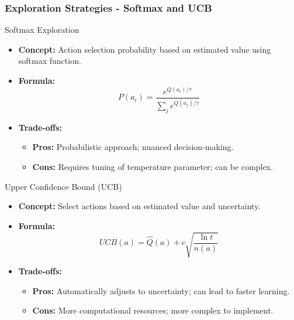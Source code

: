 \documentclass{beamer}
\begin{document}
\begin{frame}[fragile]
    \frametitle{Exploration Strategies - Softmax and UCB}
    \begin{block}{Softmax Exploration}
        \begin{itemize}
            \item \textbf{Concept:} Action selection probability based on estimated value using softmax function.
            \item \textbf{Formula:}
            \begin{equation}
                P(a_i) = \frac{e^{Q(a_i)/\tau}}{\sum_{j} e^{Q(a_j)/\tau}}
            \end{equation}
            \item \textbf{Trade-offs:}
            \begin{itemize}
                \item \textbf{Pros:} Probabilistic approach; nuanced decision-making.
                \item \textbf{Cons:} Requires tuning of temperature parameter; can be complex.
            \end{itemize}
        \end{itemize}
    \end{block}

    \begin{block}{Upper Confidence Bound (UCB)}
        \begin{itemize}
            \item \textbf{Concept:} Select actions based on estimated value and uncertainty.
            \item \textbf{Formula:}
            \begin{equation}
                UCB(a) = \hat{Q}(a) + c \sqrt{\frac{\ln t}{n(a)}}
            \end{equation}
            \item \textbf{Trade-offs:}
            \begin{itemize}
                \item \textbf{Pros:} Automatically adjusts to uncertainty; can lead to faster learning.
                \item \textbf{Cons:} More computational resources; more complex to implement.
            \end{itemize}
        \end{itemize}
    \end{block}
\end{frame}
\end{document}
